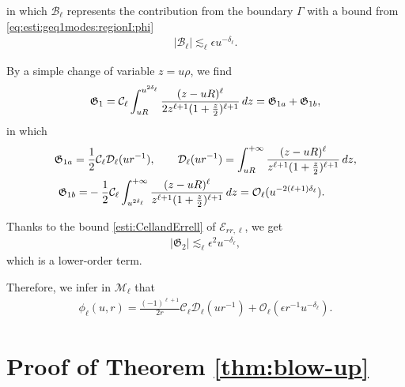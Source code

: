 \documentclass[a4paper,reqno]{amsart}
\theoremstyle{definition}
\numberwithin{equation}{section}
\def\ep{\epsilon}
\begin{document}
in which $\mathcal{B}_\ell$ represents the contribution from the boundary $\Gamma$ with a bound from \eqref{eq:esti:geq1modes:regionI:phi}
\begin{align*}
    |\mathcal{B}_\ell|
    \lesssim_{\ell}
   \ep u^{- \delta_{\ell}}.
\end{align*}

By a simple change of variable $z=u\rho$, we find
\begin{align*}
    \mathfrak{G}_1
    =
    \mathcal{C}_\ell \int_{uR}^{u^{2\delta_{\ell}}} {(z-uR)^{\ell} \over 2z^{\ell+1} (1+ {z\over 2})^{\ell+1}} \, dz
    =
    \mathfrak{G}_{1a} + \mathfrak{G}_{1b},
\end{align*}
in which
\begin{align*}
    \mathfrak{G}_{1a}
    ={}
    &\frac{1}{2}\mathcal{C}_\ell \mathcal{D}_\ell({u r^{-1}}),
    \qquad
    \mathcal{D}_\ell({u r^{-1}})
    =\int_{uR}^{+\infty} {(z-uR)^{\ell} \over z^{\ell+1} (1+ {z\over 2})^{\ell+1}} \, dz,
    \\
    \mathfrak{G}_{1b}
    =
    &-\frac{1}{2}\mathcal{C}_\ell \int_{u^{2\delta_{\ell}}}^{+\infty} {(z-uR)^{\ell} \over z^{\ell+1} (1+ {z\over 2})^{\ell+1}} \, dz
    =
    \mathcal{O}_\ell (u^{-2(\ell+1)\delta_{\ell}}).
\end{align*}

Thanks to the bound \eqref{esti:CellandErrell} of $\mathcal{E}_{rr, \ell}$, we get
\begin{align*}
    |\mathfrak{G}_2|
    \lesssim_{\ell}
     \ep^2 u^{-\delta_{\ell}},
\end{align*}
which is a lower-order term.

Therefore, we infer in $\mathcal{M}_\ell$ that
\begin{align}
    \phi_\ell (u, r)
    =
     \frac{(-1)^{\ell+1}}{2r} \mathcal{C}_\ell \mathcal{D}_\ell({u r^{-1}})
    +
    \mathcal{O}_{\ell}(\ep r^{-1}u^{-\delta_\ell}).
\end{align}


\section{Proof of Theorem \ref{thm:blow-up}}\label{sec:growth}
\end{document}
